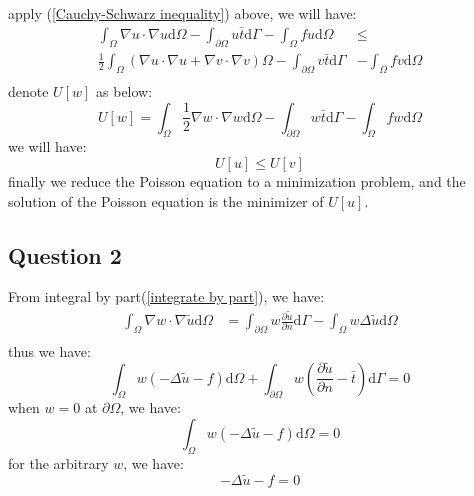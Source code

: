 apply (\ref{Cauchy-Schwarz inequality}) above,
we will have:
\begin{equation}
    \begin{aligned}
        \int_\Omega \nabla u \cdot \nabla u \mathrm{d}\Omega -
        \int_{\partial \Omega} u\bar{t} \mathrm{d}\Gamma -
        \int_\Omega f u \mathrm{d}\Omega &\leq\\
        \frac{1}{2}\int_\Omega (\nabla u\cdot \nabla u + \nabla v\cdot \nabla v) \Omega-
        \int_{\partial \Omega} v\bar{t} \mathrm{d}\Gamma &-
        \int_\Omega f v \mathrm{d}\Omega\\
    \end{aligned}
\end{equation}
denote $U[w]$ as below:
\begin{equation}
    U[w]=
    \int_\Omega \frac{1}{2}\nabla w\cdot \nabla w \mathrm{d}\Omega-
    \int_{\partial \Omega} w\bar{t} \mathrm{d}\Gamma -
    \int_\Omega f w \mathrm{d}\Omega
\end{equation}
we will have:
\begin{equation}
    U[u] \leq U[v]
\end{equation}
finally we reduce the Poisson equation to a minimization problem,
and the solution of the Poisson equation is the minimizer of $U[u]$.

\subsection{Question 2}

From integral by part(\ref{integrate by part}), we have:
\begin{equation}
    \begin{aligned}
        \int_\Omega \nabla w\cdot \nabla\tilde{u}\mathrm{d}\Omega&=
    \int_{\partial \Omega} w\frac{\partial \tilde{u}}{\partial n}\mathrm{d}\Gamma-
    \int_\Omega w\Delta \tilde{u}\mathrm{d}\Omega\\
    \end{aligned}
\end{equation}
thus we have:
\begin{equation}
    \int_\Omega w(-\Delta \tilde{u}-f)\mathrm{d}\Omega+
    \int_{\partial \Omega} w\left(
        \frac{\partial \tilde{u}}{\partial n}-\bar{t}
    \right)\mathrm{d}\Gamma=0
\end{equation}
when $w=0$ at $\partial \Omega$, we have:
\begin{equation}
    \int_\Omega w(-\Delta \tilde{u}-f)\mathrm{d}\Omega=0
\end{equation}
for the arbitrary $w$, we have:
\begin{equation}
    -\Delta \tilde{u}-f=0
\end{equation}

